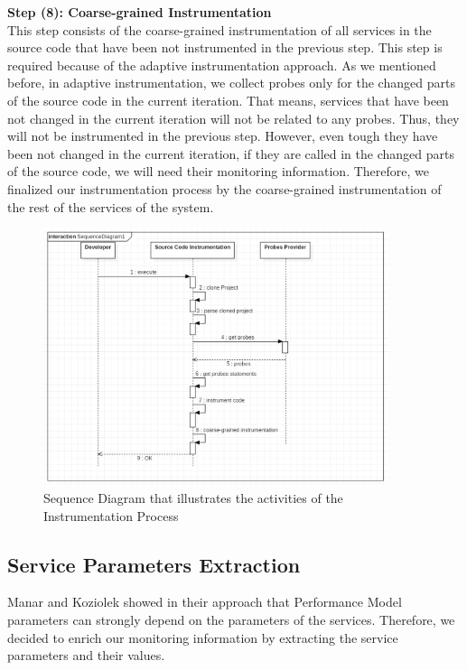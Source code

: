 \textbf{Step (8): Coarse-grained Instrumentation}\\
This step consists of the coarse-grained instrumentation of all services in the source code that have been not instrumented in the previous step.  This step is required because of the adaptive instrumentation approach. As we mentioned before, in adaptive instrumentation, we collect probes only for the changed parts of the source code in the current iteration. That means, services that have been not changed in the current iteration will not be related to any probes. Thus, they will not be instrumented in the previous step. However, even tough they have been not changed in the current iteration, if they are called in the changed parts of the source code, we will need their monitoring information. Therefore, we finalized our instrumentation process by the coarse-grained instrumentation of the rest of the services of the system.  

\begin{figure}[h]
\centering
\includegraphics[width=0.9\textwidth]{figures/instrumentation_process}
\caption{Sequence Diagram that illustrates the activities of the Instrumentation Process}
\label{fig:instrumentation_process}
\end{figure}

\subsection{Service Parameters Extraction}
\label{sec:Service Parameters Extraction}
Manar and Koziolek showed in their approach \cite{mazkatli2018continuous} that Performance Model parameters can strongly depend on the parameters of the services. Therefore, we decided to enrich our monitoring information by extracting the service parameters and their values. \\

